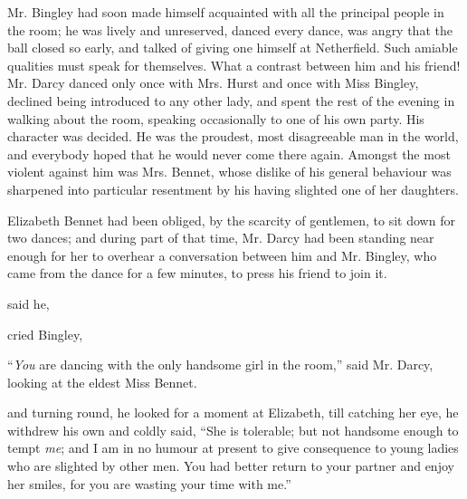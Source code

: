 Mr. Bingley had soon made himself acquainted with all the principal people in the room; he was lively and unreserved, danced every dance, was angry that the ball closed so early, and talked of giving one himself at Netherfield. Such amiable qualities must speak for themselves. What a contrast between him and his friend! Mr. Darcy danced only once with Mrs. Hurst and once with Miss Bingley, declined being introduced to any other lady, and spent the rest of the evening in walking about the room, speaking occasionally to one of his own party. His character was decided. He was the proudest, most disagreeable man in the world, and everybody hoped that he would never come there again. Amongst the most violent against him was Mrs. Bennet, whose dislike of his general behaviour was sharpened into particular resentment by his having slighted one of her daughters.

Elizabeth Bennet had been obliged, by the scarcity of gentlemen, to sit down for two dances; and during part of that time, Mr. Darcy had been standing near enough for her to overhear a conversation between him and Mr. Bingley, who came from the dance for a few minutes, to press his friend to join it.

 said he, 


 cried Bingley, 

“{\em You} are dancing with the only handsome girl in the room,” said Mr. Darcy, looking at the eldest Miss Bennet.


 and turning round, he looked for a moment at Elizabeth, till catching her eye, he withdrew his own and coldly said, “She is tolerable; but not handsome enough to tempt {\em me}; and I am in no humour at present to give consequence to young ladies who are slighted by other men. You had better return to your partner and enjoy her smiles, for you are wasting your time with me.”


